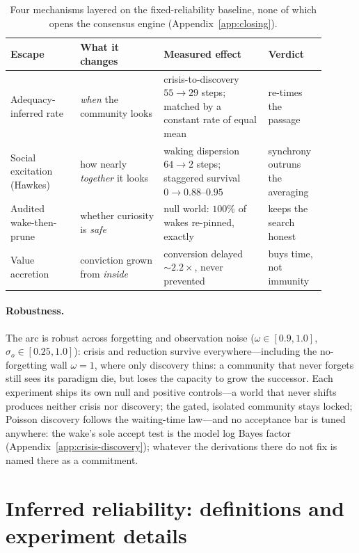 \documentclass[runningheads]{llncs}
\begin{document}
\begin{table}[h!]
\centering\footnotesize
\begin{tabular}{p{0.20\linewidth}p{0.24\linewidth}p{0.30\linewidth}p{0.16\linewidth}}
\hline
Escape & What it changes & Measured effect & Verdict \\
\hline
Adequacy-inferred rate & \emph{when} the community looks & crisis-to-discovery $55\to29$ steps;
matched by a constant rate of equal mean & re-times the passage \\[2pt]
Social excitation (Hawkes) & how nearly \emph{together} it looks & waking dispersion $64\to2$
steps; staggered survival $0\to0.88$--$0.95$ & synchrony outruns the averaging \\[2pt]
Audited wake-then-prune & whether curiosity is \emph{safe} & null world: $100\%$ of wakes
re-pinned, exactly & keeps the search honest \\[2pt]
Value accretion & conviction grown from \emph{inside} & conversion delayed $\sim2.2\times$, never
prevented & buys time, not immunity \\
\hline
\end{tabular}
\caption{Four mechanisms layered on the fixed-reliability baseline, none of which opens the
consensus engine (Appendix~\ref{app:closing}).}
\label{tab:escapes}
\end{table}

\paragraph{Robustness.}
The arc is robust across forgetting and observation noise ($\omega\in[0.9,1.0]$,
$\sigma_o\in[0.25,1.0]$): crisis and reduction survive everywhere---including the no-forgetting
wall $\omega=1$, where only discovery thins: a community that never forgets still sees its
paradigm die, but loses the capacity to grow the successor. Each experiment ships its own null
and positive controls---a world that never shifts produces neither crisis nor discovery; the
gated, isolated community stays locked; Poisson discovery follows the waiting-time law---and no
acceptance bar is tuned anywhere: the wake's sole accept test is the model log Bayes factor
(Appendix~\ref{app:crisis-discovery}); whatever the derivations there do not fix is named there
as a commitment.

\section{Inferred reliability: definitions and experiment details}
\label{app:reliability}
\end{document}
